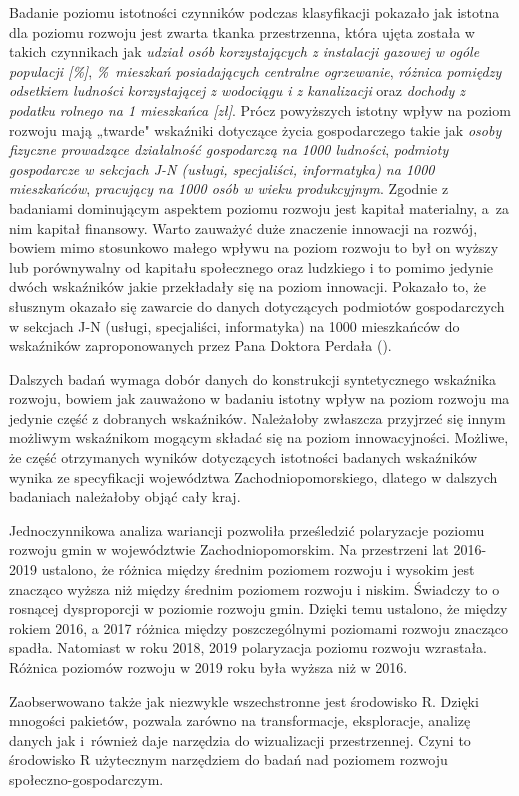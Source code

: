\documentclass{amuthesis}
\begin{document}
Badanie poziomu istotności czynników podczas klasyfikacji pokazało jak istotna dla poziomu rozwoju jest zwarta tkanka przestrzenna, która ujęta została w takich czynnikach jak \emph{udział osób korzystających z instalacji gazowej w ogóle populacji {[}\%{]}}, \emph{\%~mieszkań posiadających centralne ogrzewanie}, \emph{różnica pomiędzy odsetkiem ludności korzystającej z wodociągu i z kanalizacji} oraz \emph{dochody z podatku rolnego na 1 mieszkańca {[}zł{]}}.
Prócz powyższych istotny wpływ na poziom rozwoju mają „twarde" wskaźniki dotyczące życia gospodarczego takie jak \emph{osoby fizyczne prowadzące działalność gospodarczą na 1000 ludności}, \emph{podmioty gospodarcze w sekcjach J-N (usługi, specjaliści, informatyka) na 1000 mieszkańców}, \emph{pracujący na 1000 osób w wieku produkcyjnym}.
Zgodnie z badaniami dominującym aspektem poziomu rozwoju jest kapitał materialny, a~za nim kapitał finansowy.
Warto zauważyć duże znaczenie innowacji na rozwój, bowiem mimo stosunkowo małego wpływu na poziom rozwoju to był on wyższy lub porównywalny od kapitału społecznego oraz ludzkiego i to pomimo jedynie dwóch wskaźników jakie przekładały się na poziom innowacji.
Pokazało to, że słusznym okazało się zawarcie do danych dotyczących podmiotów gospodarczych w sekcjach J-N (usługi, specjaliści, informatyka) na 1000 mieszkańców do wskaźników zaproponowanych przez Pana Doktora Perdała (\textcite{perdal_zastosowanie}).

Dalszych badań wymaga dobór danych do konstrukcji syntetycznego wskaźnika rozwoju, bowiem jak zauważono w badaniu istotny wpływ na poziom rozwoju ma jedynie część z dobranych wskaźników.
Należałoby zwłaszcza przyjrzeć się innym możliwym wskaźnikom mogącym składać się na poziom innowacyjności.
Możliwe, że część otrzymanych wyników dotyczących istotności badanych wskaźników wynika ze specyfikacji województwa Zachodniopomorskiego, dlatego w dalszych badaniach należałoby objąć cały kraj.

Jednoczynnikowa analiza wariancji pozwoliła prześledzić polaryzacje poziomu rozwoju gmin w województwie Zachodniopomorskim.
Na przestrzeni lat 2016-2019 ustalono, że różnica między średnim poziomem rozwoju i wysokim jest znacząco wyższa niż między średnim poziomem rozwoju i niskim.
Świadczy to o rosnącej dysproporcji w poziomie rozwoju gmin.
Dzięki temu ustalono, że między rokiem 2016, a 2017 różnica między poszczególnymi poziomami rozwoju znacząco spadła.
Natomiast w roku 2018, 2019 polaryzacja poziomu rozwoju wzrastała.
Różnica poziomów rozwoju w 2019 roku była wyższa niż w 2016.

Zaobserwowano także jak niezwykle wszechstronne jest środowisko R. Dzięki mnogości pakietów, pozwala zarówno na transformacje, eksploracje, analizę danych jak i~również daje narzędzia do wizualizacji przestrzennej.
Czyni to środowisko R użytecznym narzędziem do badań nad poziomem rozwoju społeczno-gospodarczym.

\printbibliography[heading=bibintoc, title=Bibliografia]
\end{document}
